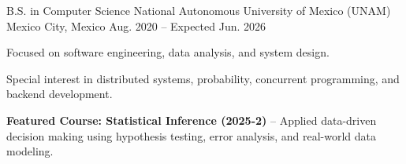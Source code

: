 \begin{cventries}

  \cventry
    {B.S. in Computer Science}
    {National Autonomous University of Mexico (UNAM)}
    {Mexico City, Mexico}
    {Aug. 2020 -- Expected Jun. 2026}
    {
      \begin{cvitems}
        \item {Focused on software engineering, data analysis, and system design.}
        \item {Special interest in distributed systems, probability, concurrent programming, and backend development.}
        \item {\textbf{Featured Course: Statistical Inference (2025-2)} – Applied data-driven decision making using hypothesis testing, error analysis, and real-world data modeling.}
      \end{cvitems}
    }

\end{cventries}
